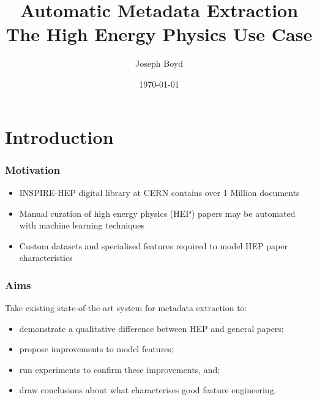 \documentclass{beamer}
\title[Automatic Metadata Extraction]{Automatic Metadata Extraction \\ The High Energy Physics Use Case} %
\author{Joseph Boyd} %
\institute[EPFL] %
{
\'Ecole Polytechnique F\'ed\'erale de Lausanne \\ %
\medskip
\textit{joseph.boyd@epfl.ch} %
}
\date{\today} %
\begin{document}
\begin{frame}
\titlepage %
\end{frame}


\section{Introduction}


\begin{frame}
\frametitle{Motivation}
\begin{itemize}
\item INSPIRE-HEP digital library at CERN contains over 1 Million documents
\item Manual curation of high energy physics (HEP) papers may be automated with machine learning techniques
\item Custom datasets and specialised features required to model HEP paper characteristics
\end{itemize}
\end{frame}


\begin{frame}
\frametitle{Aims}
Take existing state-of-the-art system for metadata extraction to:
\begin{itemize}
\item demonstrate a qualitative difference between HEP and general papers;
\item propose improvements to model features;
\item run experiments to confirm these improvements, and;
\item draw conclusions about what characterises good feature engineering.
\end{itemize}
\end{frame}

\end{document}
